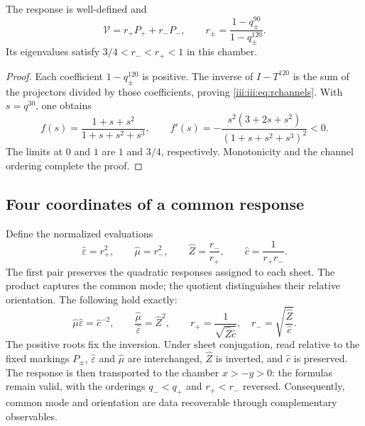 \begin{proposition}
The response is well-defined and
\begin{equation}
 \mathcal V=r_+P_++r_-P_-,\qquad
 r_\pm=\frac{1-q_\pm^{90}}{1-q_\pm^{120}}.
 \label{iii:iii:eq:rchannels}
\end{equation}
Its eigenvalues satisfy $3/4<r_-<r_+<1$ in this chamber.
\end{proposition}
\begin{proof}
Each coefficient $1-q_\pm^{120}$ is positive. The inverse of $I-T^{120}$
is the sum of the projectors divided by those coefficients, proving
\eqref{iii:iii:eq:rchannels}. With $s=q^{30}$, one obtains
\begin{equation}
 f(s)=\frac{1+s+s^2}{1+s+s^2+s^3},\qquad
 f'(s)=-\frac{s^2(3+2s+s^2)}{(1+s+s^2+s^3)^2}<0.
 \label{iii:iii:eq:monotone}
\end{equation}
The limits at $0$ and $1$ are $1$ and $3/4$, respectively. Monotonicity
and the channel ordering complete the proof.
\end{proof}

\subsection{Four coordinates of a common response}

Define the normalized evaluations
\begin{equation}
 \widehat\varepsilon=r_+^2,\qquad
 \widehat\mu=r_-^2,\qquad
 \widehat Z=\frac{r_-}{r_+},\qquad
 \widehat c=\frac1{r_+r_-}.
 \label{iii:iii:eq:four}
\end{equation}
The first pair preserves the quadratic responses assigned to each sheet.
The product captures the common mode; the quotient distinguishes their relative orientation.
The following hold exactly:
\begin{equation}
 \widehat\mu\widehat\varepsilon=\widehat c^{-2},\qquad
 \frac{\widehat\mu}{\widehat\varepsilon}=\widehat Z^2,
 \qquad
 r_+=\frac1{\sqrt{\widehat Z\widehat c}},\quad
 r_-=\sqrt{\frac{\widehat Z}{\widehat c}}.
 \label{iii:iii:eq:four-identities}
\end{equation}
The positive roots fix the inversion. Under sheet conjugation,
read relative to the fixed markings $P_\pm$,
$\widehat\varepsilon$ and $\widehat\mu$ are interchanged,
$\widehat Z$ is inverted, and $\widehat c$ is preserved. The response is then transported
to the chamber $x>-y>0$: the formulas remain valid, with the orderings
$q_-<q_+$ and $r_+<r_-$ reversed. Consequently, common mode
and orientation are data recoverable through complementary observables.

